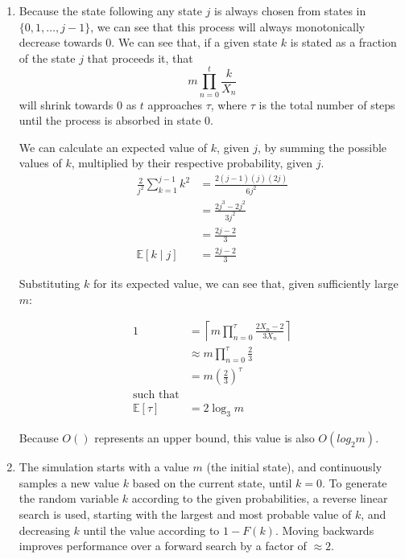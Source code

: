 \begin{solution}
    \begin{enumerate}
        \item
            Because the state following any state $j$ is always chosen
            from states in $\{0,1,\ldots,j-1\}$, we can see that this
            process will always monotonically decrease towards $0$. We
            can see that, if a given state $k$ is stated as a fraction
            of the state $j$ that proceeds it, that
            \[
                m \prod_{n=0}^t \frac{k}{X_n}
            \]
            will shrink towards $0$ as $t$ approaches $\tau$, where
            $\tau$ is the total number of steps until the process is
            absorbed in state $0$.

            We can calculate an expected value of $k$, given $j$, by
            summing the possible values of $k$, multiplied by their
            respective probability, given $j$.
            \begin{align*}
                \frac{2}{j^2} \sum_{k=1}^{j-1}k^2
                &= \frac{2(j-1)(j)(2j)}{6j^2}\\
                &= \frac{2j^3-2j^2}{3j^2}\\
                &= \frac{2j-2}{3} \\
                \mathbb E[k \mid j] &= \frac{2j-2}{3}
            \end{align*}

            Substituting $k$ for its expected value, we can see that,
            given sufficiently large $m$:

            \begin{align*}
                1 &= \left\lceil m\prod_{n=0}^\tau \frac{2 X_n-2}{3 X_n}
                \right\rceil\\
                  & \approx  m \prod_{n=0}^\tau \frac{2}{3}\\
                  &= m \left(\frac{2}{3}\right)^\tau\\
                  \text{such that}\\
                    \mathbb E[\tau] &=2\log_3m
            \end{align*}

            Because $O()$ represents an upper bound, this value is also
            $O(log_2m)$.

        \item

            The simulation starts with a value $m$ (the initial state),
            and continuously samples a new value $k$ based on the
            current state, until $k = 0$. To generate the random
            variable $k$ according to the given probabilities, a reverse
            linear search is used, starting with the largest and most
            probable value of $k$, and decreasing $k$ until the value
            according to $1 - F(k)$. Moving backwards improves
            performance over a forward search by a factor of $\approx
            2$.


\end{enumerate}
\end{solution}
